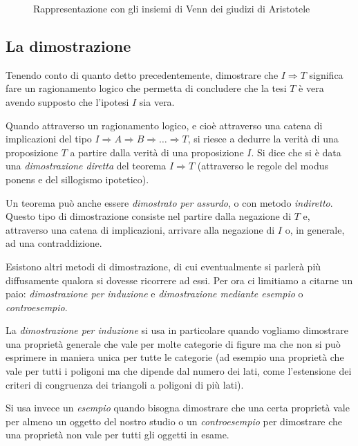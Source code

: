 \begin{inaccessibleblock}
 \begin{figure}[bth]
 \centering
 \caption{Rappresentazione con gli insiemi di Venn dei giudizi di 
Aristotele}\label{fig:1.1}
\end{figure}
\end{inaccessibleblock}

\subsection{La dimostrazione}

Tenendo conto di quanto detto precedentemente, dimostrare che 
\(I\Rightarrow T\) significa fare un ragionamento logico che permetta 
di concludere che la tesi \(T\) è vera avendo supposto che l'ipotesi 
\(I\) sia vera.

Quando attraverso un ragionamento logico, e cioè attraverso una 
catena di implicazioni del tipo  \(I\Rightarrow A\Rightarrow 
B\Rightarrow \ldots{} \Rightarrow T\), si riesce a dedurre la verità 
di una proposizione \(T\) a partire dalla verità di una proposizione 
\(I\). Si dice che si è data una \emph{dimostrazione diretta} del 
teorema \(I\Rightarrow T\) (attraverso le regole del modus ponens e del 
sillogismo ipotetico).

Un teorema può anche essere \emph{dimostrato per assurdo}, o con 
metodo \emph{indiretto}. Questo tipo di dimostrazione consiste nel 
partire dalla negazione di \(T\) e, attraverso una catena di 
implicazioni, arrivare alla negazione di \(I\) o, in generale, ad una 
contraddizione.

Esistono altri metodi di dimostrazione, di cui eventualmente si 
parlerà più diffusamente qualora si dovesse ricorrere ad essi. Per 
ora ci limitiamo a citarne un paio: \emph{dimostrazione per 
induzione} e \emph{dimostrazione mediante esempio} o 
\emph{controesempio}.

La \emph{dimostrazione per induzione} si usa in particolare quando 
vogliamo dimostrare una proprietà generale che vale per molte 
categorie di figure ma che non si può esprimere in maniera unica per 
tutte le categorie (ad esempio una proprietà che vale per tutti i 
poligoni ma che dipende dal numero dei lati, come l'estensione dei 
criteri di congruenza dei triangoli a poligoni di più lati).

Si usa invece un \emph{esempio} quando bisogna dimostrare che una 
certa proprietà vale per almeno un oggetto del nostro studio o un 
\emph{controesempio} per dimostrare che una proprietà non vale per 
tutti gli oggetti in esame.

